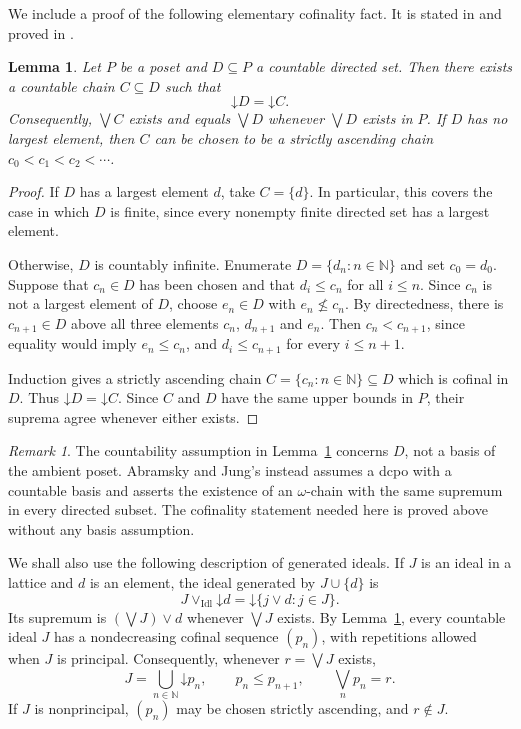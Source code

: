 \documentclass[preprint,11pt]{elsarticle}
\newtheorem{lemma}[theorem]{Lemma}
\theoremstyle{definition}
\theoremstyle{remark}
\newtheorem*{remark}{Remark}
\numberwithin{equation}{section}
\newcommand{\N}{\mathbb N}
\newcommand{\down}[1]{\mathord{\downarrow}#1}
\newcommand{\jc}{\vee}
\newcommand{\Idl}{\operatorname{Idl}}
\begin{document}
We include a proof of the following elementary cofinality fact. It is stated in \cite[Lemma~4.18]{LawsonXu} and proved in \cite[Lemma~1]{LawsonXuLower}.

\begin{lemma}\label{lem:cofinal-chain}
Let $P$ be a poset and $D\subseteq P$ a countable directed set. Then there exists a countable chain $C\subseteq D$ such that
\[
 \down D=\down C.
\]
Consequently, $\bigvee C$ exists and equals $\bigvee D$ whenever $\bigvee D$ exists in $P$. If $D$ has no largest element, then $C$ can be chosen to be a strictly ascending chain $c_0<c_1<c_2<\cdots$.
\end{lemma}
\begin{proof}
If $D$ has a largest element $d$, take $C=\{d\}$. In particular, this covers the case in which $D$ is finite, since every nonempty finite directed set has a largest element.

Otherwise, $D$ is countably infinite. Enumerate $D=\{d_n:n\in\N\}$ and set $c_0=d_0$. Suppose that $c_n\in D$ has been chosen and that $d_i\le c_n$ for all $i\le n$. Since $c_n$ is not a largest element of $D$, choose $e_n\in D$ with $e_n\nleq c_n$. By directedness, there is $c_{n+1}\in D$ above all three elements $c_n$, $d_{n+1}$ and $e_n$. Then $c_n<c_{n+1}$, since equality would imply $e_n\le c_n$, and $d_i\le c_{n+1}$ for every $i\le n+1$.

Induction gives a strictly ascending chain $C=\{c_n:n\in\N\}\subseteq D$ which is cofinal in $D$. Thus $\down D=\down C$. Since $C$ and $D$ have the same upper bounds in $P$, their suprema agree whenever either exists.
\end{proof}

\begin{remark}
The countability assumption in Lemma~\ref{lem:cofinal-chain} concerns $D$, not a basis of the ambient poset. Abramsky and Jung's \cite[Proposition~2.2.13]{AbramskyJung} instead assumes a dcpo with a countable basis and asserts the existence of an $\omega$-chain with the same supremum in every directed subset. The cofinality statement needed here is proved above without any basis assumption.
\end{remark}

We shall also use the following description of generated ideals. If $J$ is an ideal in a lattice and $d$ is an element, the ideal generated by $J\cup\{d\}$ is
\begin{equation}\label{eq:idealjoin}
 J\mathbin{\vee_{\Idl}}\down d
 =\down\{j\jc d:j\in J\}.
\end{equation}
Its supremum is $(\bigvee J)\jc d$ whenever $\bigvee J$ exists. By Lemma~\ref{lem:cofinal-chain}, every countable ideal $J$ has a nondecreasing cofinal sequence $(p_n)$, with repetitions allowed when $J$ is principal. Consequently, whenever $r=\bigvee J$ exists,
\begin{equation}\label{eq:cofinal}
 J=\bigcup_{n\in\N}\down p_n,
 \qquad p_n\le p_{n+1},\qquad \bigvee_n p_n=r.
\end{equation}
If $J$ is nonprincipal, $(p_n)$ may be chosen strictly ascending, and $r\notin J$.
\end{document}
